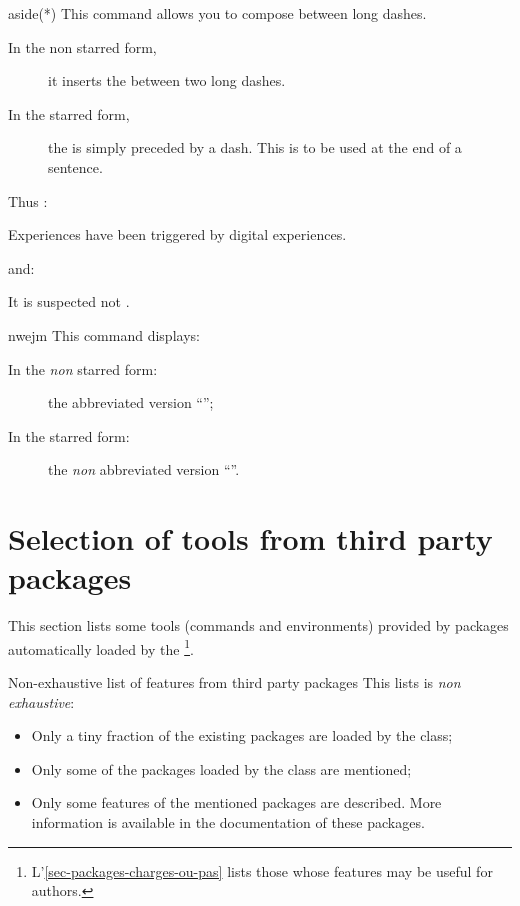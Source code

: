 \documentclass[english,nolocaltoc]{nwejmart}
\newtheorem[style=definition]{fact}
\newtheorem[title-plural=Criteria]{criterion}
\newtheorem[title=random experiment]{rexp}
\begin{document}
\begin{docCommand}{aside(*)}{}
  This command allows you to compose   between long dashes.
  \begin{description}
  \item[In the non starred form,] it inserts the    between
    two long dashes.
  \item[In the starred form,]  the  is simply preceded by a
    dash. This is to be used at the end of a sentence.
  \end{description}
  Thus :
  \begin{bodycode}
Experiences  have been triggered by digital experiences.   
\end{bodycode}
  and:
\begin{bodycode}[listing and text,listing options={deletekeywords={example}}]
It is suspected not  .
\end{bodycode}
\end{docCommand}

\begin{docCommand}{nwejm}{}
  This command displays:
  \begin{description}
  \item[In the \emph{non} starred form:] the abbreviated version \enquote{\nwejm{}};
  \item[In the  starred form:] the \emph{non} abbreviated version \enquote{\nwejm*{}}.
  \end{description}
\end{docCommand}

\section{Selection of tools from third party packages}

This section lists some tools (commands and environments) provided by
packages automatically loaded by the
\nwejmauthorcl\footnote{L'\vref{sec-packages-charges-ou-pas} lists
  those whose features may be useful for authors.}.

\begin{dbwarning}{Non-exhaustive list of features from third party packages}{}
  This lists is  \emph{non exhaustive}:
  \begin{itemize}
  \item Only a tiny fraction of the existing packages are loaded by
    the class;
  \item Only some of the packages loaded by the class are mentioned;
  \item Only some features of the mentioned packages are
    described. More information is available in the documentation of
    these packages.
  \end{itemize}
\end{dbwarning}
\end{document}
